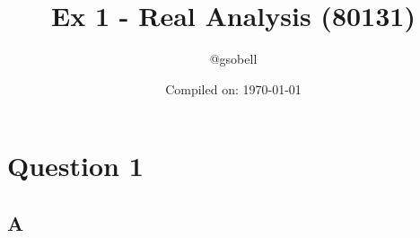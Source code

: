 \documentclass[11pt]{article}
\title{\textbf{Ex 1 - Real Analysis (80131)}}
\author{@gsobell}
\date{Compiled on: \today}
\begin{document}
\maketitle
{}
\setcounter{section}{0}

\section{Question 1}
\subsection{A}
\end{document}
